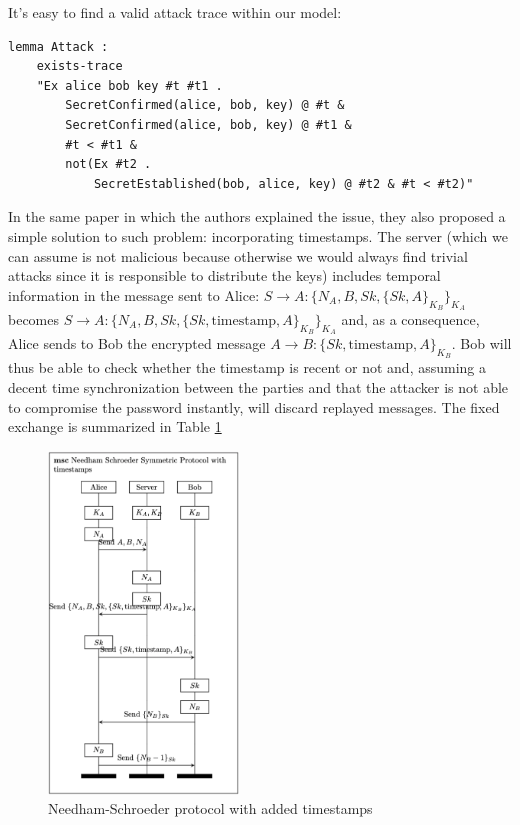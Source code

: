 \documentclass[fleqn,10pt]{SelfArx} %
\begin{document}
It's easy to find a valid attack trace within our model:

\begin{lstlisting}[language=Tamarin]
lemma Attack :
    exists-trace
    "Ex alice bob key #t #t1 . 
        SecretConfirmed(alice, bob, key) @ #t &
        SecretConfirmed(alice, bob, key) @ #t1 &
        #t < #t1 &
        not(Ex #t2 .
            SecretEstablished(bob, alice, key) @ #t2 & #t < #t2)"
\end{lstlisting}

In the same paper in which the authors explained the issue, they also proposed a simple solution to such problem: incorporating timestamps. The server (which we can assume is not malicious because otherwise we would always find trivial attacks since it is responsible to distribute the keys) includes temporal information in the message sent to Alice: $S \to A: \{N_A, B, Sk, \{Sk, A\}_{K_B} \}_{K_A}$ becomes $S \to A: \{N_A, B, Sk, \{Sk, \textrm{timestamp}, A\}_{K_B} \}_{K_A}$ and, as a consequence, Alice sends to Bob the encrypted message $A \to B: \{Sk, \textrm{timestamp}, A\}_{K_B}$. Bob will thus be able to check whether the timestamp is recent or not and, assuming a decent time synchronization between the parties and that the attacker is not able to compromise the password instantly, will discard replayed messages. The fixed exchange is summarized in Table \ref{fig:NS_fixed}

\begin{figure}[h]
    \centering
    \captionsetup{justification=centering, margin=1cm}
    \includegraphics[width=0.45\textwidth]{Figures/NS_fixed.png}
    \caption{Needham-Schroeder protocol with added timestamps}
    \label{fig:NS_fixed}
\end{figure}
%
\end{document}
